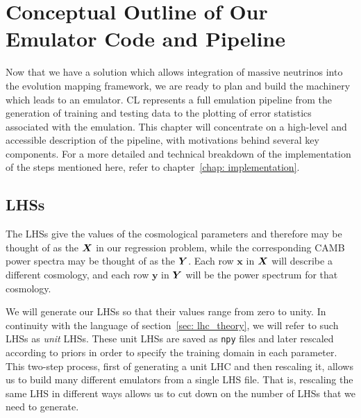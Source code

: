 \chapter{Conceptual Outline of Our Emulator Code and Pipeline}
\label{chap: emu_outline}

Now that we have a solution which allows integration of massive neutrinos
into the evolution mapping framework, we are ready to plan and build the
machinery which leads to an emulator. CL represents a full emulation pipeline from the generation of training and 
testing data to the plotting of error statistics associated with
the emulation. This chapter will concentrate on a high-level and accessible 
description of the pipeline, with motivations behind several key components.
For a more detailed and technical breakdown of the implementation of the steps
mentioned here, refer to chapter~\ref{chap: implementation}.


\section{LHSs}
\label{sec: lhc_outline}

The LHSs give the values of the cosmological parameters and therefore may be 
thought of as the $\bm{X}$ in our regression problem, while the 
corresponding CAMB power spectra may be thought of as the $\bm{Y}$. Each
row $\bm{x}$ in $\bm{X}$ will describe a different cosmology, and each
row $\bm{y}$ in $\bm{Y}$ will be the power spectrum for that cosmology.

\begin{comment}
to
emphasize the roles of these data in the training and testing of the emulator. 
However, we will continue to use the term ``unit'' as introduced here, and 
the reader should keep in mind that a unit $\matr{X}_u$ therefore does not
indicate an identity matrix.}
\end{comment}


We will generate our LHSs so that their values range from zero to unity.
In continuity with the language of section~\ref{sec: lhc_theory}, we will 
refer to such LHSs as \textit{unit} LHSs. These unit LHSs are saved as
\texttt{npy} files and later rescaled according to priors in order to
specify the training
domain in each parameter. This two-step process, first of generating a unit
LHC and then rescaling it, allows us to build many different emulators from a 
single LHS file. That is, rescaling the same LHS in different ways allows us
to cut down on the number of LHSs that we need to generate.

